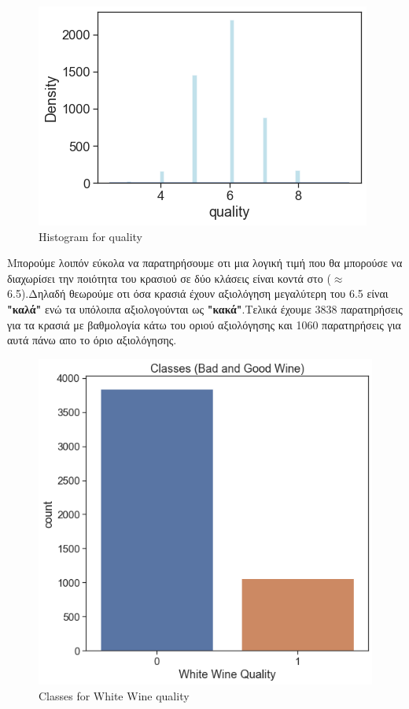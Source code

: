 \documentclass[12pt,a4paper]{article}
\begin{document}
\begin{figure}[H]
\centering
\includegraphics[width=0.30\linewidth,height=0.20\textheight]{Images/plot1}
\caption{Histogram for quality}
\label{fig:imagea}
\end{figure}
Μπορούμε λοιπόν εύκολα να παρατηρήσουμε οτι μια λογική τιμή που θα μπορούσε να διαχωρίσει την ποιότητα του κρασιού σε δύο κλάσεις είναι κοντά στο ($ \approx $ 6.5).Δηλαδή θεωρούμε οτι όσα κρασιά έχουν αξιολόγηση μεγαλύτερη του 6.5 είναι \textbf{"καλά"} ενώ τα υπόλοιπα αξιολογούνται ως \textbf{"κακά"}.Τελικά έχουμε 3838 παρατηρήσεις για τα κρασιά με βαθμολογία κάτω του οριού αξιολόγησης και 1060 παρατηρήσεις για αυτά πάνω απο το όριο αξιολόγησης.

\begin{figure}[H]
\centering
\includegraphics[width=0.30\linewidth,height=0.20\textheight]{Images/plot2}
\caption{Classes for White Wine quality}
\label{fig:imagea}
\end{figure}
\end{document}
